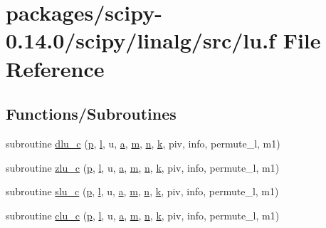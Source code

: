 \hypertarget{lu_8f}{}\section{packages/scipy-\/0.14.0/scipy/linalg/src/lu.f File Reference}
\label{lu_8f}
\subsection*{Functions/\+Subroutines}
\begin{DoxyCompactItemize}
\item 
subroutine \hyperlink{lu_8f_af36a1dc716100717e2a43d9ce16cc2d3}{dlu\+\_\+c} (\hyperlink{indexexpr_8h_a2b8c103eb5bfc196fbc3d29923e28ac1}{p}, \hyperlink{indexexpr_8h_a88aacdaa46b76729743ee33ef8b95a58}{l}, u, \hyperlink{gen__mat5files_8m_aae328bf20413f220e38aec4d95bfd6da}{a}, \hyperlink{indexexpr_8h_ab72fdb4031d47b75ab26dd18a437bcdc}{m}, \hyperlink{indexexpr_8h_ab427e2e2b4d6cec55fa088ea2a692ace}{n}, \hyperlink{indexexpr_8h_abb72938a198351550846b37a84588b63}{k}, piv, info, permute\+\_\+l, m1)
\item 
subroutine \hyperlink{lu_8f_a3f07b9a0603c55ff2ac10478c6a81077}{zlu\+\_\+c} (\hyperlink{indexexpr_8h_a2b8c103eb5bfc196fbc3d29923e28ac1}{p}, \hyperlink{indexexpr_8h_a88aacdaa46b76729743ee33ef8b95a58}{l}, u, \hyperlink{gen__mat5files_8m_aae328bf20413f220e38aec4d95bfd6da}{a}, \hyperlink{indexexpr_8h_ab72fdb4031d47b75ab26dd18a437bcdc}{m}, \hyperlink{indexexpr_8h_ab427e2e2b4d6cec55fa088ea2a692ace}{n}, \hyperlink{indexexpr_8h_abb72938a198351550846b37a84588b63}{k}, piv, info, permute\+\_\+l, m1)
\item 
subroutine \hyperlink{lu_8f_a3eea14d2fa285c47e593ca5253a1c0a6}{slu\+\_\+c} (\hyperlink{indexexpr_8h_a2b8c103eb5bfc196fbc3d29923e28ac1}{p}, \hyperlink{indexexpr_8h_a88aacdaa46b76729743ee33ef8b95a58}{l}, u, \hyperlink{gen__mat5files_8m_aae328bf20413f220e38aec4d95bfd6da}{a}, \hyperlink{indexexpr_8h_ab72fdb4031d47b75ab26dd18a437bcdc}{m}, \hyperlink{indexexpr_8h_ab427e2e2b4d6cec55fa088ea2a692ace}{n}, \hyperlink{indexexpr_8h_abb72938a198351550846b37a84588b63}{k}, piv, info, permute\+\_\+l, m1)
\item 
subroutine \hyperlink{lu_8f_aad87112948e7d1a4eefdee9d3dade1d5}{clu\+\_\+c} (\hyperlink{indexexpr_8h_a2b8c103eb5bfc196fbc3d29923e28ac1}{p}, \hyperlink{indexexpr_8h_a88aacdaa46b76729743ee33ef8b95a58}{l}, u, \hyperlink{gen__mat5files_8m_aae328bf20413f220e38aec4d95bfd6da}{a}, \hyperlink{indexexpr_8h_ab72fdb4031d47b75ab26dd18a437bcdc}{m}, \hyperlink{indexexpr_8h_ab427e2e2b4d6cec55fa088ea2a692ace}{n}, \hyperlink{indexexpr_8h_abb72938a198351550846b37a84588b63}{k}, piv, info, permute\+\_\+l, m1)
\end{DoxyCompactItemize}


